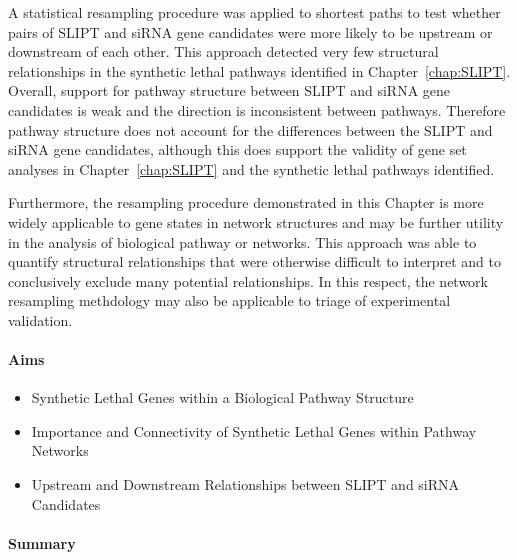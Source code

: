 A statistical resampling procedure was applied to shortest paths to test whether pairs of \gls{SLIPT} and \gls{siRNA} gene candidates were more likely to be upstream or downstream of each other. This approach detected very few structural relationships in the synthetic lethal pathways identified in Chapter~\ref{chap:SLIPT}. Overall, support for pathway structure between \gls{SLIPT} and \gls{siRNA} gene candidates is weak and the direction is inconsistent between pathways. Therefore pathway structure does not account for the differences between the \gls{SLIPT} and \gls{siRNA} gene candidates, although this does support the validity of gene set analyses in Chapter~\ref{chap:SLIPT} and the synthetic lethal pathways identified.

Furthermore, the resampling procedure demonstrated in this Chapter is more widely applicable to gene states in network structures and may be further utility in the analysis of biological pathway or networks. This approach was able to quantify structural relationships that were otherwise difficult to interpret and to conclusively exclude many potential relationships. In this respect, the network resampling methdology may also be applicable to triage of experimental validation.

\clearpage

\paragraph{Aims}

  \begin{itemize}
   \item Synthetic Lethal Genes within a Biological Pathway Structure
   
   \bigskip
   
   \item Importance and Connectivity of Synthetic Lethal Genes within Pathway Networks
   
   \bigskip
   
   \item Upstream and Downstream Relationships between SLIPT and siRNA Candidates
  \end{itemize}

\paragraph{Summary}

